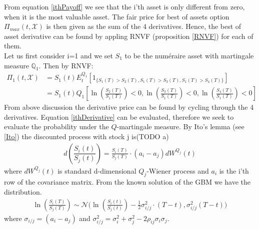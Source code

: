 From equation \eqref{ithPayoff} we see that the i'th asset is only different from zero, when it is the most valuable asset. The fair price for best of assets option $\Pi_{max}(t,\mathcal{X})$ is then given as the sum of the 4 derivatives. Hence, the best of asset derivative can be found by appling RNVF (proposition \ref{RNVF}) for each of them.\\

Let us first consider i=1 and we set $S_1$ to be the numéraire asset with martingale measure $\mathbb{Q}_1$. Then by RNVF:
\begin{equation}\label{ithDerivative}
\begin{split}
\Pi_1(t, \mathcal{X})&=S_1(t)E_t^{Q_1}[1_{\{S_1(T)>S_2(T), S_1(T)>S_3(T), S_1(T)>S_4(T)\}}]\\
&=S_1(t) Q_1[\ln(\frac{S_2(T)}{S_1(T)})<0, \ln(\frac{S_3(T)}{S_1(T)})<0, \ln(\frac{S_4(T)}{S_1(T)})<0]
\end{split}
\end{equation}
From above discussion the derivative price can be found by cycling through the 4 derivatives. Equation \eqref{ithDerivative} can be evaluated, therefore we seek to evaluate the probability under the $Q$-martingale measure. By Ito's lemma (see \ref{Ito}) the discounted process with stock j is(TODO a)
\begin{align*}
d(\dfrac{S_i(t)}{S_j(t)})=\frac{S_i(T)}{S_j(T)} \cdot (a_i-a_j)dW^{Q_j}(t) 
\end{align*}
where $dW^{Q_j}(t)$ is standard d-dimensional $Q_j$-Wiener process and $a_i$ is the i'th row of the covariance matrix. From the known solution of the GBM we have the distribution.
\begin{align*}
\ln(\frac{S_i(T)}{S_j(T)})\sim \mathcal{N}\bigg(\ln(\frac{S_i(t)}{S_j(t)}) - \frac{1}{2}\sigma_{i/j}^2 \cdot (T-t), \sigma_{i/j}^2 (T-t)\bigg)
\end{align*}
where $\sigma_{i/j}=(a_i-a_j)$ and $\sigma_{i/j}^2=\sigma_i^2+\sigma_j^2-2\rho_{ij}\sigma_i \sigma_j$.\\

